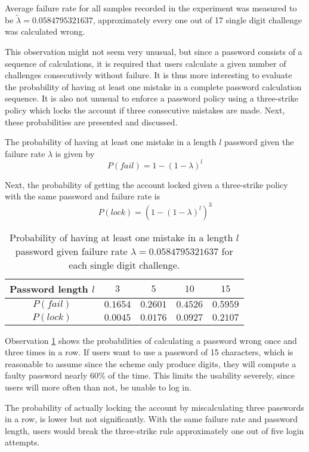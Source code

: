 \begin{observation}\label{obs:failrate}
    Average failure rate for all samples recorded in the experiment was measured to be $\tilde \lambda = 0.0584795321637$, approximately every one out of 17 single digit challenge was calculated wrong.
\end{observation}
This observation might not seem very unusual, but since a password consists of a sequence of calculations, it is required that users calculate a given number of challenges consecutively without failure. It is thus more interesting to evaluate the probability of having at least one mistake in a complete password calculation sequence. It is also not unusual to enforce a password policy using a three-strike policy which locks the account if three consecutive mistakes are made. Next, these probabilities are presented and discussed. 


The probability of having at least one mistake in a length $l$ password given the failure rate $\lambda$ is given by
\begin{equation}\label{eq:failrate}
    P(fail) = 1 - (1 - \lambda)^l
\end{equation}

Next, the probability of getting the account locked given a three-strike policy with the same password and failure rate is 
\begin{equation}\label{eq:lockrate}
    P(lock) = ( 1 - (1 - \lambda)^l )^3
\end{equation}


\begin{table}[h]
    \centering
\begin{tabular}{|c|c|c|c|c|}
    \hline
    Password length $l$ & $3$ & $5$ & $10$ & $15$ \\ \hline \hline
    $P(fail)$ & $0.1654$ & $0.2601$ & $0.4526$ & $0.5959$ \\ \hline
    $P(lock)$ & $0.0045$ & $0.0176$ & $0.0927$ & $0.2107$ \\ \hline
\end{tabular}
\caption{Probability of having at least one mistake in a length $l$ password given failure rate $\lambda = 0.0584795321637$ for each single digit challenge.}
\label{tbl:failrate}
\end{table}
 
\par Observation \ref{tbl:failrate} shows the probabilities of calculating a password wrong once and three times in a row. If users want to use a password of 15 characters, which is reasonable to assume since the scheme only produce digits, they will compute a faulty password nearly 60\% of the time. This limits the usability severely, since users will more often than not, be unable to log in.
\par The probability of actually locking the account by miscalculating three passwords in a row, is lower but not significantly. With the same failure rate and password length, users would break the three-strike rule approximately one out of five login attempts.

